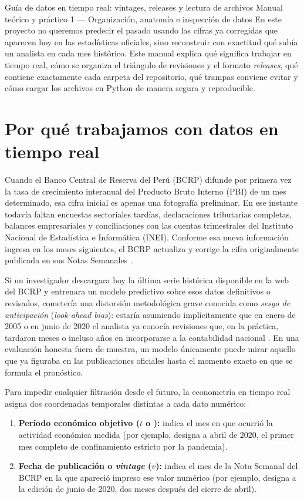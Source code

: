 \documentclass[12pt,letterpaper]{article}
\begin{document}
\apacabecera
  {Guía de datos en tiempo real: vintages, releases y lectura de archivos}
  {Manual teórico y práctico 1 — Organización, anatomía e inspección de datos}
  {En este proyecto no queremos predecir el pasado usando las cifras ya corregidas que aparecen hoy en las estadísticas oficiales, sino reconstruir con exactitud qué sabía un analista en cada mes histórico. Este manual explica qué significa trabajar en tiempo real, cómo se organiza el triángulo de revisiones y el formato \emph{releases}, qué contiene exactamente cada carpeta del repositorio, qué trampas conviene evitar y cómo cargar los archivos en Python de manera segura y reproducible.}

\section{Por qué trabajamos con datos en tiempo real}

Cuando el Banco Central de Reserva del Perú (BCRP) difunde por primera vez la tasa de crecimiento interanual del Producto Bruto Interno (PBI) de un mes determinado, esa cifra inicial es apenas una fotografía preliminar. En ese instante todavía faltan encuestas sectoriales tardías, declaraciones tributarias completas, balances empresariales y conciliaciones con las cuentas trimestrales del Instituto Nacional de Estadística e Informática (INEI). Conforme esa nueva información ingresa en los meses siguientes, el BCRP actualiza y corrige la cifra originalmente publicada en sus Notas Semanales \parencite{cruz2025}.

Si un investigador descargara hoy la última serie histórica disponible en la web del BCRP y entrenara un modelo predictivo sobre esos datos definitivos o revisados, cometería una distorsión metodológica grave conocida como \emph{sesgo de anticipación} (\emph{look-ahead bias}): estaría asumiendo implícitamente que en enero de 2005 o en junio de 2020 el analista ya conocía revisiones que, en la práctica, tardaron meses o incluso años en incorporarse a la contabilidad nacional \parencite{croushore2011}. En una evaluación honesta fuera de muestra, un modelo únicamente puede mirar aquello que ya figuraba en las publicaciones oficiales hasta el momento exacto en que se formula el pronóstico.

Para impedir cualquier filtración desde el futuro, la econometría en tiempo real asigna dos coordenadas temporales distintas a cada dato numérico:
\begin{enumerate}
  \item \textbf{Período económico objetivo (\(t\) o ):} indica el mes en que ocurrió la actividad económica medida (por ejemplo,  designa a abril de 2020, el primer mes completo de confinamiento estricto por la pandemia).
  \item \textbf{Fecha de publicación o \emph{vintage} (\(v\)):} indica el mes de la Nota Semanal del BCRP en la que apareció impreso ese valor numérico (por ejemplo,  designa a la edición de junio de 2020, dos meses después del cierre de abril).
\end{enumerate}
\end{document}
